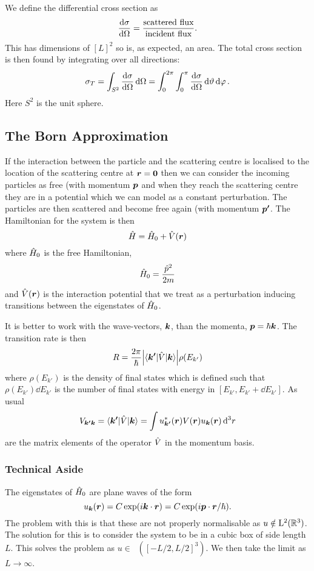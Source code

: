 \documentclass[a4paper]{article}
\renewcommand{\ket}[1]{\vert {#1} \rangle}
\renewcommand{\bra}[1]{\langle {#1} \vert}
\DeclareMathOperator{\squareIntegrable}{L^2}
\begin{document}
    We define the differential cross section as
    \[\dv{\sigma}{\Omega} = \frac{\text{scattered flux}}{\text{incident flux}}.\]
    This has dimensions of \([L]^2\) so is, as expected, an area.
    The total cross section is then found by integrating over all directions:
    \[\sigma_{T} = \int_{S^2} \dv{\sigma}{\Omega}\dd{\Omega} = \int_{0}^{2\pi}\int_{0}^{\pi} \dv{\sigma}{\Omega} \dd{\vartheta}\dd{\varphi}.\]
    Here \(S^2\) is the unit sphere.
    
    \subsection{The Born Approximation}
    If the interaction between the particle and the scattering centre is localised to the location of the scattering centre at \(\bm{r} = \bm{0}\) then we can consider the incoming particles as free (with momentum \(\bm{p}\) and when they reach the scattering centre they are in a potential which we can model as a constant perturbation.
    The particles are then scattered and become free again (with momentum \(\bm{p'}\).
    The Hamiltonian for the system is then
    \[\hat{H} = \hat{H}_0 + \hat{V}(\bm{r})\]
    where \(\hat{H}_0\) is the free Hamiltonian,
    \[\hat{H}_0 = \frac{\hat{p}^2}{2m}\]
    and \(\hat{V}(\bm{r})\) is the interaction potential that we treat as a perturbation inducing transitions between the eigenstates of \(\hat{H}_0\).
    
    It is better to work with the wave-vectors, \(\bm{k}\), than the momenta, \(\bm{p} = \hbar\bm{k}\).
    The transition rate is then
    \[R = \frac{2\pi}{\hbar} \abs{\bra{\vv{k'}} \operator{V} \ket{\vv{k}}} \rho(E_{k'})\]
    where \(\rho(E_{k'})\) is the density of final states which is defined such that \(\rho(E_{k'})\dd{E_{k'}}\) is the number of final states with energy in \([E_{k'}, E_{k'} + \dd{E_{k'}}]\).
    As usual
    \[V_{\vv{k'}\vv{k}} = \bra{\vv{k'}}\operator{V}\ket{\vv{k}} = \int u_{\vv{k'}}^*(\vv{r}) V(\vv{r}) u_{\vv{k}}(\vv{r}) \dd[3]{r}\]
    are the matrix elements of the operator \(\hat{V}\) in the momentum basis.
    
    \subsubsection{Technical Aside}
    The eigenstates of \(\hat{H}_{0}\) are plane waves of the form
    \[u_{\bm{k}}(\bm{r}) = C\exp(i\bm{k}\cdot\bm{r}) = C\exp(i\bm{p}\cdot\bm{r}/\hbar).\]
    The problem with this is that these are not properly normalisable as \(u\notin\squareIntegrable(\reals^3)\).
    The solution for this is to consider the system to be in a cubic box of side length \(L\).
    This solves the problem as \(u\in\squareIntegrable([-L/2, L/2]^3)\).
    We then take the limit as \(L \to \infty\).
    
\end{document}
